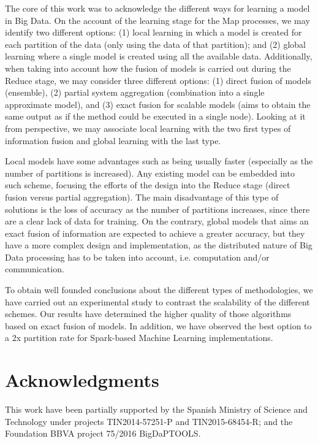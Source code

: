 \documentclass[3p,review]{elsarticle}
\begin{document}
The core of this work was to acknowledge the different ways for learning a model in Big Data. On the account of the learning stage for the Map processes, we may identify two different options: (1) local learning in which a model is created for each partition of the data (only using the data of that partition); and (2) global learning where a single model is created using all the available data. Additionally, when taking into account how the fusion of models is carried out during the Reduce stage, we may consider three different options: (1) direct fusion of models (ensemble), (2) partial system aggregation (combination into a single approximate model), and (3) exact fusion for scalable models (aims to obtain the same output as if the method could be executed in a single node). Looking at it from perspective, we may associate local learning with the two first types of information fusion and global learning with the last type. 

Local models have some advantages such as being usually faster (especially as the number of partitions is increased). Any existing model can be embedded into such scheme, focusing the efforts of the design into the Reduce stage (direct fusion versus partial aggregation). The main disadvantage of this type of solutions is the loss of accuracy as the number of partitions increases, since there are a clear lack of data for training. On the contrary, global models that aims an exact fusion of information are expected to achieve a greater accuracy, but they have a more complex design and implementation, as the distributed nature of Big Data processing has to be taken into account, i.e. computation and/or communication.

To obtain well founded conclusions about the different types of methodologies, we have carried out an experimental study to contrast the scalability of the different schemes. Our results have determined the higher quality of those algorithms based on exact fusion of models. In addition, we have observed the best option to a 2x partition rate for Spark-based Machine Learning implementations. 

\section*{Acknowledgments}\label{sec:ack}

This work have been partially supported by the Spanish Ministry of Science and Technology under projects TIN2014-57251-P and TIN2015-68454-R; and the Foundation BBVA project 75/2016 BigDaPTOOLS.




\end{document}
